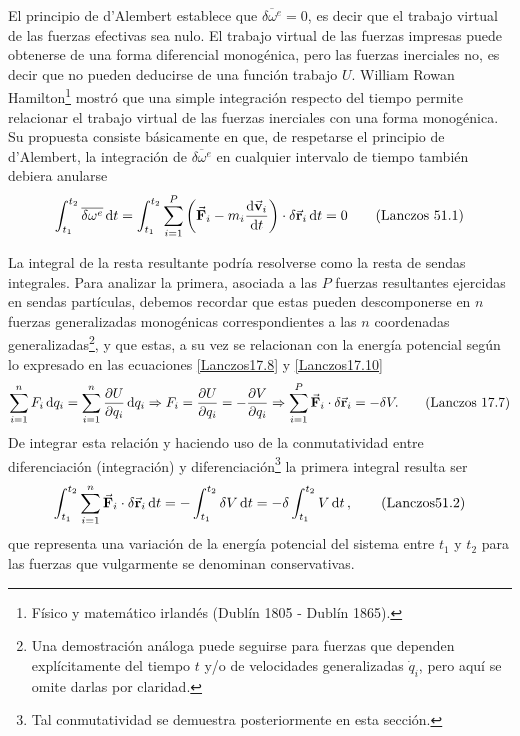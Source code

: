 \documentclass[12pt, spanish, a4paper, ]{article}
\begin{document}
El principio de d'Alembert establece que \(\overline{\delta \omega^e}= 0\), es decir que el trabajo virtual de las fuerzas efectivas sea nulo.
El trabajo virtual de las fuerzas impresas puede obtenerse de una forma diferencial monogénica, pero las fuerzas inerciales no, es decir que no pueden deducirse de una función trabajo \(U\).
William Rowan Hamilton\footnote{Físico y matemático irlandés (Dublín 1805 - Dublín 1865).} mostró que una simple integración respecto del tiempo permite relacionar el trabajo virtual de las fuerzas inerciales con una forma monogénica.
Su propuesta consiste básicamente en que, de respetarse el principio de d'Alembert, la integración de \(\overline{\delta \omega^e}\) en cualquier intervalo de tiempo también debiera anularse
\begin{equation}\label{Lanczos51.1}
	\int^{t_2}_{t_1} \overline{\delta \omega^e} \dd{t}= \int^{t_2}_{t_1} \sum_{i=1}^P \pqty{ \va{F}_i - m_i \dv{\va{v}_i}{t} } \cdot \delta \va{r}_i \dd{t}= 0 
	\tag{Lanczos 51.1}
\end{equation}

La integral de la resta resultante podría resolverse como la resta de sendas integrales.
Para analizar la primera, asociada a las \(P\) fuerzas resultantes ejercidas en sendas partículas, debemos recordar que estas pueden descomponerse en \(n\) fuerzas generalizadas monogénicas correspondientes a las \(n\) coordenadas generalizadas\footnote{
    Una demostración análoga puede seguirse para fuerzas que dependen explícitamente del tiempo \(t\) y/o de velocidades generalizadas \(\dot{q}_i\), pero aquí se omite darlas por claridad.
}, y que estas, a su vez se relacionan con la energía potencial según lo expresado en las ecuaciones \eqref{Lanczos17.8} y \eqref{Lanczos17.10} 
\begin{equation}\label{Lanczos17.7}
	\sum_{i=1}^n F_i \dd{q_i}= \sum_{i=1}^n \pdv{U}{q_i} \dd{q_i} \Rightarrow F_i= \pdv{U}{q_i}= - \pdv{V}{q_i} \Rightarrow \sum_{i=1}^P \va{F}_i \cdot \delta \va{r}_i = - \delta V.
	\tag{Lanczos 17.7}
\end{equation}
De integrar esta relación y haciendo uso de la conmutatividad entre diferenciación (integración) y diferenciación\footnote{Tal conmutatividad se demuestra posteriormente en esta sección.} la primera integral resulta ser
\begin{equation}\label{Lanczos51.2}
	\int^{t_2}_{t_1} \sum_{i=1}^n \va{F}_i \cdot \delta \va{r}_i \dd{t} = - \int^{t_2}_{t_1} \delta V \dd{t}=
- \delta \int^{t_2}_{t_1} V \dd{t} ,
	\tag{Lanczos51.2}
\end{equation} 
que representa una variación de la energía potencial del sistema entre \(t_1\) y \(t_2\) para las fuerzas que vulgarmente se denominan conservativas.
\end{document}
